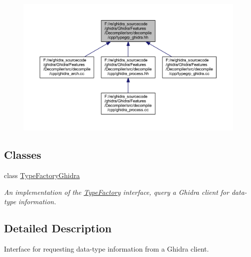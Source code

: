 \nopagebreak
\begin{figure}[H]
\begin{center}
\leavevmode
\includegraphics[width=350pt]{typegrp__ghidra_8hh__dep__incl}
\end{center}
\end{figure}
\subsection*{Classes}
\begin{DoxyCompactItemize}
\item 
class \mbox{\hyperlink{class_type_factory_ghidra}{Type\+Factory\+Ghidra}}
\begin{DoxyCompactList}\small\item\em An implementation of the \mbox{\hyperlink{class_type_factory}{Type\+Factory}} interface, query a Ghidra client for data-\/type information. \end{DoxyCompactList}\end{DoxyCompactItemize}


\subsection{Detailed Description}
Interface for requesting data-\/type information from a Ghidra client. 

